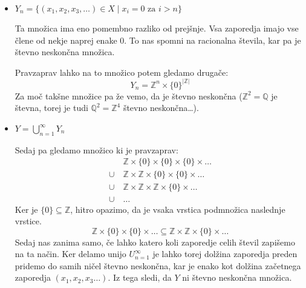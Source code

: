 \documentclass[a4paper, 12pt]{article}
\newcommand{\ZZ}{\ensuremath{\mathbb{Z}}}
\newcommand{\QQ}{\ensuremath{\mathbb{Q}}}
\begin{document}
\begin{itemize}
        \item $Y_n = \{ (x_1, x_2, x_3, \ldots ) \in X \mid x_i = 0 \text{ za } i > n \}$
        
        Ta množica ima eno pomembno razliko od prejšnje. Vsa zaporedja imajo vse člene od nekje naprej enake 0. To nas spomni na racionalna števila, kar pa je števno neskončna množica.
        
        Pravzaprav lahko na to množico potem gledamo drugače:
        \[
        Y_n = \ZZ ^ n \times \{0\} ^{|\ZZ|}
        \]
        Za moč takšne množice pa že vemo, da je števno neskončna ($\ZZ^2 = \QQ$ je števna, torej je tudi $\QQ^2 = \ZZ^4$ števno neskončna\ldots).
        \item $Y = \bigcup_{n=1}^\infty Y_n$
        
        Sedaj pa gledamo množico ki je pravzaprav: 
        \begin{align*}
        &\ZZ \times \{0\} \times \{0\} \times \{0\} \times \ldots \\
        \cup\ &\ZZ \times \ZZ \times \{0\} \times \{0\}  \times \ldots \\
        \cup\ &\ZZ \times \ZZ \times \ZZ \times \{0 \} \times \ldots \\
        \cup\ &\ldots
        \end{align*}
        Ker je $\{0\} \subseteq \ZZ$, hitro opazimo, da je vsaka vrstica podmnožica naslednje vrstice.
        \[
        \ZZ \times \{0\} \times \{0\}\times \ldots \subseteq \ZZ \times \ZZ \times \{0\} \times \ldots
        \]
        Sedaj nas zanima samo, če lahko katero koli zaporedje celih števil zapišemo na ta način. Ker delamo unijo $U_{n=1}^\infty$ je lahko torej dolžina zaporedja preden pridemo do samih ničel števno neskončna, kar je enako kot dolžina začetnega zaporedja $(x_1, x_2, x_3 \ldots)$. Iz tega sledi, da $Y$ ni števno neskončna množica.
    \end{itemize}
   
\end{document}
